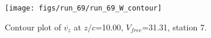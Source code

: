 \begin{figure}[H]
\centering
\texttt{[image: figs/run\_69/run\_69\_W\_contour]}
\caption{Contour plot of $\overline{v_{z}}$ at $z/c$=10.00, $V_{free}$=31.31, station 7.}
\label{fig:run_69_W_contour}
\end{figure}


